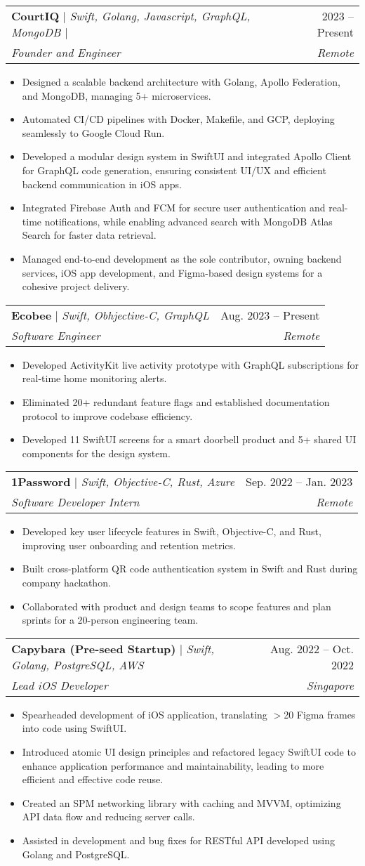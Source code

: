\documentclass[letterpaper,11pt]{article}
\makeatletter
\newcommand{\resumeItem}[1]{
  \item\small{
    {#1 \vspace{-1pt}}  %
  }
}
\newcommand{\resumeSubheading}[4]{
  \vspace{-2pt}\item
    \begin{tabular*}{0.97\textwidth}[t]{l@{\extracolsep{\fill}}r}
      #1 & #2 \\  %
      \textit{\small#3} & \textit{\small #4} \\
    \end{tabular*}\vspace{-5pt}
}
\newcommand{\resumeItemListStart}{\begin{itemize}}
\newcommand{\resumeItemListEnd}{\end{itemize}\vspace{-5pt}}
\makeatother
\begin{document}
    \resumeSubheading
    {\textbf{CourtIQ} $|$ \emph{Swift, Golang, Javascript, GraphQL, MongoDB $|$ \href{https://github.com/CourtIQ/courtiq-ios}{\color{linkblue}\faGithub}
    }}{2023 -- Present}
    {Founder and Engineer}{Remote}
    \resumeItemListStart
    \resumeItem{Designed a scalable backend architecture with Golang, Apollo Federation, and MongoDB, managing 5+ microservices.}
    \resumeItem{Automated CI/CD pipelines with Docker, Makefile, and GCP, deploying seamlessly to Google Cloud Run.}
      \resumeItem{Developed a modular design system in SwiftUI and integrated Apollo Client for GraphQL code generation, ensuring consistent UI/UX and efficient backend communication in iOS apps.}      
      \resumeItem{Integrated Firebase Auth and FCM for secure user authentication and real-time notifications, while enabling advanced search with MongoDB Atlas Search for faster data retrieval.}
      \resumeItem{Managed end-to-end development as the sole contributor, owning backend services, iOS app development, and Figma-based design systems for a cohesive project delivery.}
    \resumeItemListEnd

    \resumeSubheading
      {\textbf{Ecobee} $|$ \emph{Swift, Obhjective-C, GraphQL}}{Aug. 2023 -- Present}
      {Software Engineer}{Remote}
      \resumeItemListStart
      \resumeItem{Developed ActivityKit live activity prototype with GraphQL subscriptions for real-time home monitoring alerts.}
      \resumeItem{Eliminated 20+ redundant feature flags and established documentation protocol to improve codebase efficiency.}
      \resumeItem{Developed 11 SwiftUI screens for a smart doorbell product and 5+ shared UI components for the design system.}
    \resumeItemListEnd
      
    \resumeSubheading
      {\textbf{1Password} $|$ \emph{Swift, Objective-C, Rust, Azure}}{Sep. 2022 -- Jan. 2023}
      {Software Developer Intern}{Remote}
      \resumeItemListStart
      \resumeItem{Developed key user lifecycle features in Swift, Objective-C, and Rust, improving user onboarding and retention metrics.}
      \resumeItem{Built cross-platform QR code authentication system in Swift and Rust during company hackathon.}
      \resumeItem{Collaborated with product and design teams to scope features and plan sprints for a 20-person engineering team.}
    \resumeItemListEnd
    
    \resumeSubheading
      {\textbf{Capybara (Pre-seed Startup)} $|$ \emph{Swift, Golang, PostgreSQL, AWS}}{Aug. 2022 -- Oct. 2022}
      {Lead iOS Developer}{Singapore}
      \resumeItemListStart
        \resumeItem{Spearheaded development of iOS application, translating $>$20 Figma frames into code using SwiftUI.}
        \resumeItem{Introduced atomic UI design principles and refactored legacy SwiftUI code to enhance application performance and maintainability, leading to more efficient and effective code reuse.}
        \resumeItem{Created an SPM networking library with caching and MVVM, optimizing API data flow and reducing server calls.}
        \resumeItem{Assisted in development and bug fixes for RESTful API developed using Golang and PostgreSQL.}
      \resumeItemListEnd
\end{document}
